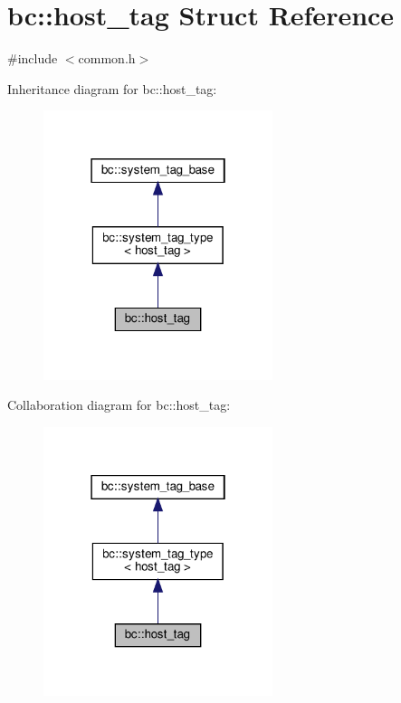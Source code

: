 \hypertarget{structbc_1_1host__tag}{}\section{bc\+:\+:host\+\_\+tag Struct Reference}
\label{structbc_1_1host__tag}


{\ttfamily \#include $<$common.\+h$>$}



Inheritance diagram for bc\+:\+:host\+\_\+tag\+:\nopagebreak
\begin{figure}[H]
\begin{center}
\leavevmode
\includegraphics[width=190pt]{structbc_1_1host__tag__inherit__graph}
\end{center}
\end{figure}


Collaboration diagram for bc\+:\+:host\+\_\+tag\+:\nopagebreak
\begin{figure}[H]
\begin{center}
\leavevmode
\includegraphics[width=190pt]{structbc_1_1host__tag__coll__graph}
\end{center}
\end{figure}
